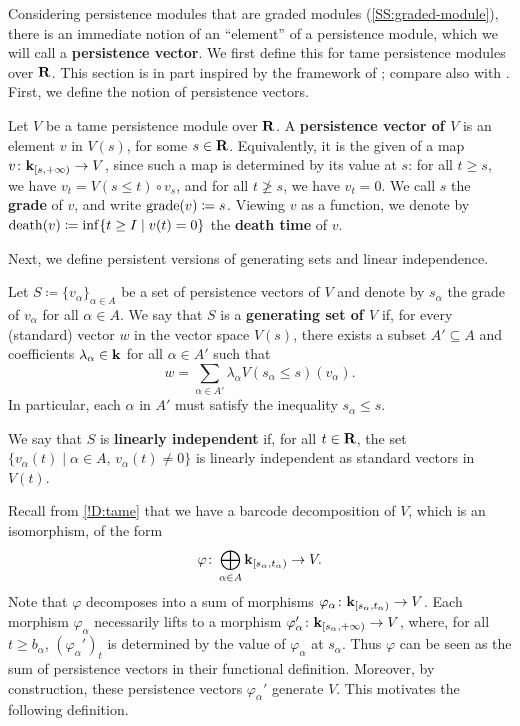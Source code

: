 Considering persistence modules that are graded modules (\cref{SS:graded-module}), there is an immediate notion of an ``element'' of a persistence module, which we will call a \textbf{persistence vector}. We first define this for tame persistence modules over $\mathbf{R}$. This section is in part inspired by the framework of \cite{TorrasCasas2023}; compare also with \cite[Section 6]{BSS2023}. First, we define the notion of persistence vectors.

\begin{definition}
  Let $V$ be a tame persistence module over $\mathbf{R}$. A \textbf{persistence vector of $V$} is an element $v$ in $V(s)$, for some $s \in \mathbf{R}$.
  Equivalently, it is the given of a map $v \colon \mathbf{k}_{[s, +\infty)} \to V$, since such a map is determined by its value at $s$: for all $t \geq s$, we have $v_t = V(s \leq t) \circ v_s$, and for all $t \not\geq s$, we have $v_t = 0$.
  We call $s$ the \textbf{grade} of $v$, and write $\operatorname{grade}(v) \coloneq s$. Viewing $v$ as a function, we denote by $\operatorname{death}(v) \coloneq \inf\{t \geq I \mid v(t) = 0\}$ the \textbf{death time} of $v$.
\end{definition}

Next, we define persistent versions of generating sets and linear independence.

\begin{definition}
  Let $S \coloneq \{v_\alpha\}_{\alpha \in A}$ be a set of persistence vectors of $V$ and denote by $s_\alpha$ the grade of $v_\alpha$ for all $\alpha \in A$.
  We say that $S$ is a \textbf{generating set of $V$} if, for every (standard) vector $w$ in the vector space $V(s)$, there exists a subset $A' \subseteq A$ and coefficients $\lambda_\alpha \in \mathbf{k}$ for all $\alpha \in A'$ such that
  \begin{equation}
  \label{Eq:generating-set}
    w = \sum_{\alpha \in A'} \lambda_\alpha V(s_\alpha \leq s)(v_\alpha).
  \end{equation}
  In particular, each $\alpha$ in $A'$ must satisfy the inequality $s_\alpha \leq s$.
  
  We say that $S$ is \textbf{linearly independent} if, for all $t \in \mathbf{R}$, the set $\{v_\alpha(t) \mid \alpha \in A, \, v_\alpha(t) \neq 0\}$ is linearly independent as standard vectors in $V(t)$.
\end{definition}

Recall from \cref{!D:tame} that we have a barcode decomposition of $V$, which is an isomorphism, of the form
\[
  \varphi \colon \bigoplus_{\alpha \in A} \mathbf{k}_{[s_\alpha, t_\alpha)} \to V.
\]
Note that $\varphi$ decomposes into a sum of morphisms $\varphi_\alpha \colon \mathbf{k}_{[s_\alpha, t_\alpha)} \to V$. Each morphism $\varphi_\alpha$ necessarily lifts to a morphism $\varphi_\alpha' \colon \mathbf{k}_{[s_\alpha, +\infty)} \to V$, where, for all $t \geq b_\alpha$, $(\varphi_\alpha')_t$ is determined by the value of $\varphi_\alpha$ at $s_\alpha$. Thus $\varphi$ can be seen as the sum of persistence vectors in their functional definition. Moreover, by construction, these persistence vectors $\varphi_\alpha'$ generate $V$. This motivates the following definition.


